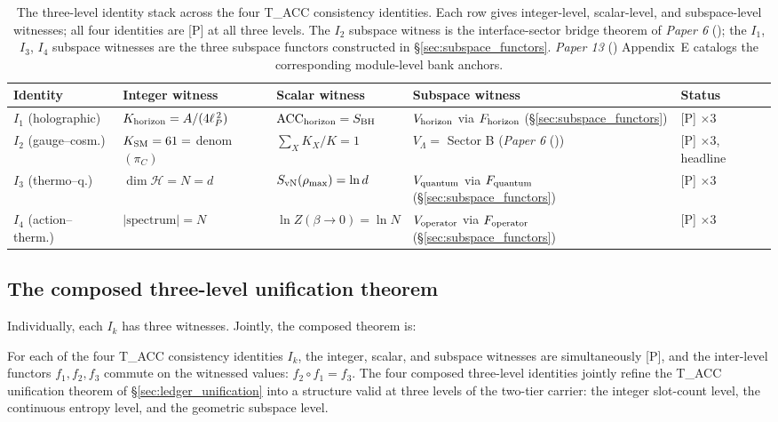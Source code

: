 \documentclass[11pt]{article}
\newcommand{\paperref}[2]{\emph{Paper #1} (\emph{#2})}
\begin{document}
\begin{table}[h]
\centering
\small
\begin{tabularx}{\textwidth}{@{}l X X X l@{}}
\toprule
\textbf{Identity} & \textbf{Integer witness} & \textbf{Scalar witness} & \textbf{Subspace witness} & \textbf{Status} \\
\midrule
$I_1$ (holographic) &
    $K_{\rm horizon} = A/(4\ell_P^{\,2})$ &
    $\mathrm{ACC}_{\rm horizon} = S_{\rm BH}$ &
    $V_{\rm horizon}$ via $F_{\rm horizon}$ (\S\ref{sec:subspace_functors}) &
    [P] $\times 3$ \\
\addlinespace[3pt]
$I_2$ (gauge--cosm.) &
    $K_{\rm SM} = 61 = $ denom$(\pi_C)$ &
    $\sum_X K_X/K = 1$ &
    $V_\Lambda = $ Sector B (\paperref{6}{}) &
    [P] $\times 3$, headline \\
\addlinespace[3pt]
$I_3$ (thermo--q.) &
    $\dim\mathcal{H} = N = d$ &
    $S_{\rm vN}(\rho_{\rm max}) = \ln d$ &
    $V_{\rm quantum}$ via $F_{\rm quantum}$ (\S\ref{sec:subspace_functors}) &
    [P] $\times 3$ \\
\addlinespace[3pt]
$I_4$ (action--therm.) &
    $\lvert\text{spectrum}\rvert = N$ &
    $\ln Z(\beta\!\to\!0) = \ln N$ &
    $V_{\rm operator}$ via $F_{\rm operator}$ (\S\ref{sec:subspace_functors}) &
    [P] $\times 3$ \\
\bottomrule
\end{tabularx}
\caption{The three-level identity stack across the four T\_ACC consistency identities. Each row gives integer-level, scalar-level, and subspace-level witnesses; all four identities are [P] at all three levels. The $I_2$ subspace witness is the interface-sector bridge theorem of \paperref{6}{}; the $I_1$, $I_3$, $I_4$ subspace witnesses are the three subspace functors constructed in \S\ref{sec:subspace_functors}. \paperref{13}{} Appendix~E catalogs the corresponding module-level bank anchors.}\label{tab:three_level}
\end{table}

\subsection{The composed three-level unification theorem}\label{sec:three_level_unification}

Individually, each $I_k$ has three witnesses. Jointly, the composed theorem is:

\begin{tcolorbox}[apfbox, title={Theorem T\_three\_level\_unification}]
For each of the four T\_ACC consistency identities $I_k$, the integer, scalar, and subspace witnesses are simultaneously [P], and the inter-level functors $f_1, f_2, f_3$ commute on the witnessed values: $f_2 \circ f_1 = f_3$. The four composed three-level identities jointly refine the T\_ACC unification theorem of \S\ref{sec:ledger_unification} into a structure valid at three levels of the two-tier carrier: the integer slot-count level, the continuous entropy level, and the geometric subspace level.
\end{tcolorbox}
\end{document}
